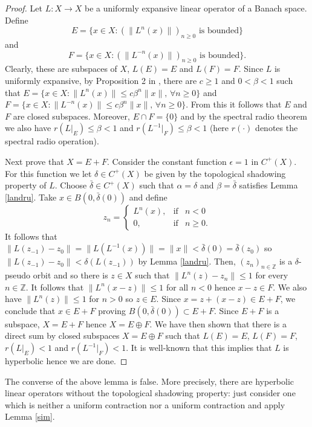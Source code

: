 \documentclass[11pt,letterpaper]{amsart}
\numberwithin{equation}{section}
\begin{document}
\begin{proof}
Let $L:X\to X$ be a uniformly expansive linear operator of a Banach space.
Define
$$
E=\{x\in X:(\|L^n(x)\|)_{n\geq0}\mbox{ is bounded}\}
$$
and
$$
F=\{x\in X:(\|L^{-n}(x)\|)_{n\geq0}\mbox{ is bounded}\}.
$$
Clearly, these are subspaces of $X$, $L(E)=E$ and $L(F)=F$.
Since $L$ is uniformly expansive, by Proposition 2 in \cite{bm}, there are $c\geq1$ and $0<\beta<1$ such that
$
E=\{x\in X:\|L^n(x)\|\leq c\beta^n\|x\|,\, \forall n\geq0\}
$
and
$
F=\{x\in X:\|L^{-n}(x)\|\leq c\beta^n\|x\|,\, \forall n\geq0\}.
$
From this it follows that $E$ and $F$ are closed subspaces. Moreover,
$E\cap F=\{0\}$ and by the spectral radio theorem we also have
$r(L|_E)\leq \beta<1$ and $r(L^{-1}|_F)\leq\beta<1$
(here $r(\cdot)$ denotes the spectral radio operation).

Next prove that $X=E+F$.
Consider the constant function $\epsilon=1$ in $C^+(X)$.
For this function we let $\delta\in C^+(X)$ be given by the topological shadowing property of $L$. Choose $\bar{\delta}\in C^+(X)$ such that
$\alpha=\delta$ and $\beta=\bar{\delta}$ satisfies Lemma \ref{landru}.
Take $x\in B(0,\bar{\delta}(0))$ and define
$$
z_n= \left\{
\begin{array}{rcl}
L^n(x),  & \mbox{if} & n<0\\
0,& \mbox{if} & n\geq0.
\end{array}
\right.
$$
It follows that
$
\|L(z_{-1})-z_0\|=\|L(L^{-1}(x))\|=\|x\|<\bar{\delta}(0)=\bar{\delta}(z_0)
$
so
$
\|L(z_{-1})-z_0\|<\delta(L(z_{-1}))
$ by Lemma \ref{landru}.
Then,
$(z_n)_{n\in\mathbb{Z}}$ is a $\delta$-pseudo orbit and so
there is $z\in X$ such that
$\|L^n(z)-z_n\|\leq 1$ for every $n\in\mathbb{Z}$.
It follows that $\|L^n(x-z)\|\leq 1$ for all $n<0$ hence $x-z\in F$.
We also have $\|L^n(z)\|\leq 1$ for $n>0$ so $z\in E$.
Since $x=z+(x-z)\in E+F$, we conclude that $x\in E+F$ proving
$B(0,\bar{\delta}(0))\subset E+F$.
Since $E+F$ is a subspace, $X=E+F$ hence $X=E\oplus F$.
We have then shown that there is a direct sum by closed subspaces $X=E\oplus F$ such that $L(E)=E$, $L(F)=F$, $r(L|_E)<1$ and $r(L^{-1}|_F)<1$. It is well-known that this implies that $L$ is hyperbolic hence we are done.
\end{proof}

The converse of the above lemma is false. More precisely, there are hyperbolic linear operators without the topological shadowing property:
just consider one which is neither a uniform contraction nor a uniform contraction
and apply Lemma \ref{sim}.
\end{document}
